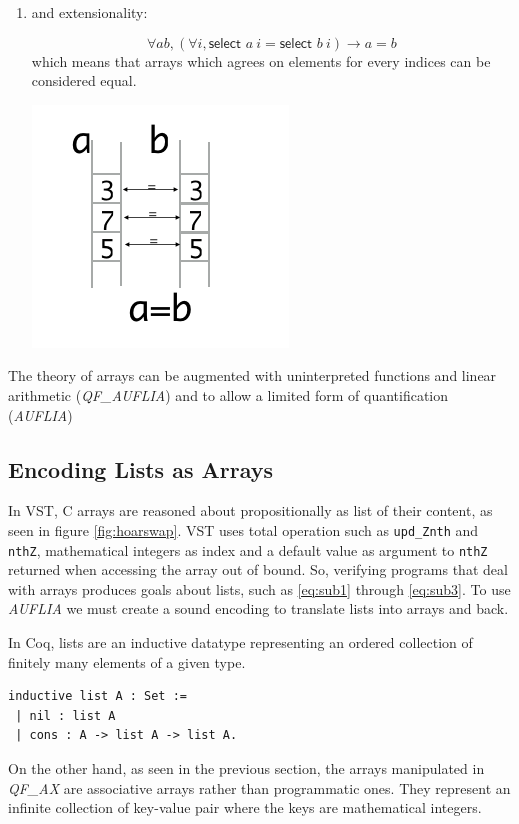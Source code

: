 \documentclass[onecolumn, preprint]{sigplanconf}
\begin{document}
\begin{enumerate}
\item and extensionality:
  
  \begin{multicols}{2}
  $$ \forall a b, (\forall i, \textsf{select } a\ i = \textsf{select } b\ i) \to a = b$$
  which means that arrays which agrees on elements for every indices can be considered equal.

  \includegraphics[scale=0.5]{pictures/axiom3.png}
  \end{multicols}
  \end{enumerate}
  

The theory of arrays can be augmented with uninterpreted functions and linear arithmetic (\emph{QF\_AUFLIA}) and to allow a limited form of quantification (\emph{AUFLIA})



\subsection{Encoding Lists as Arrays}

In VST, C arrays are reasoned about propositionally as list of their content, as seen in figure \ref{fig:hoarswap}. VST uses total operation such as \texttt{upd\_Znth} and \texttt{nthZ}, mathematical integers as index and a default value as argument to \texttt{nthZ} returned when accessing the array out of bound. So, verifying programs that deal with arrays produces goals about lists, such as \ref{eq:sub1} through \ref{eq:sub3}. To use \emph{AUFLIA} we must create a sound encoding to translate lists into arrays and back. 

In Coq, lists are an inductive datatype representing an ordered collection of finitely many elements of a given type.
\begin{center}
\begin{lstlisting}
inductive list A : Set :=
 | nil : list A
 | cons : A -> list A -> list A.
\end{lstlisting}
\end{center}
On the other hand, as seen in the previous section, the arrays manipulated in \emph{QF\_AX} are associative arrays rather than programmatic ones. They represent an infinite collection of key-value pair where the keys are mathematical integers. 
\end{document}
